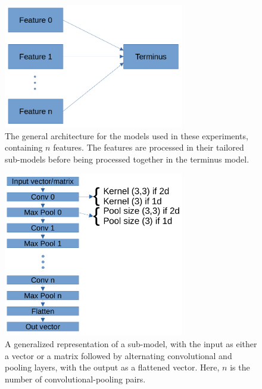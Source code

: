 \documentclass{article}
\begin{document}
			\begin{figure}[htbp]
				\begin{center}
					\includegraphics[width=0.7\textwidth]{images/model_fig.png}
					\caption{The general architecture for the models used in these experiments,
					containing \(n\) features. The features are processed in their tailored
					sub-models before being processed together in the terminus model.}
					\label{fig:model_plot}
				\end{center}
			\end{figure}
			\begin{figure}[htbp]
				\begin{center}
					\includegraphics[width=0.7\textwidth]{images/submodel.png}
					\caption{A generalized representation of a sub-model, with the input as either
					a vector or a matrix followed by alternating convolutional and pooling layers,
					with the output as a flattened vector. Here, \(n\) is the number of
					convolutional-pooling pairs.}
					\label{fig:submodel}
				\end{center}
			\end{figure}
\end{document}
